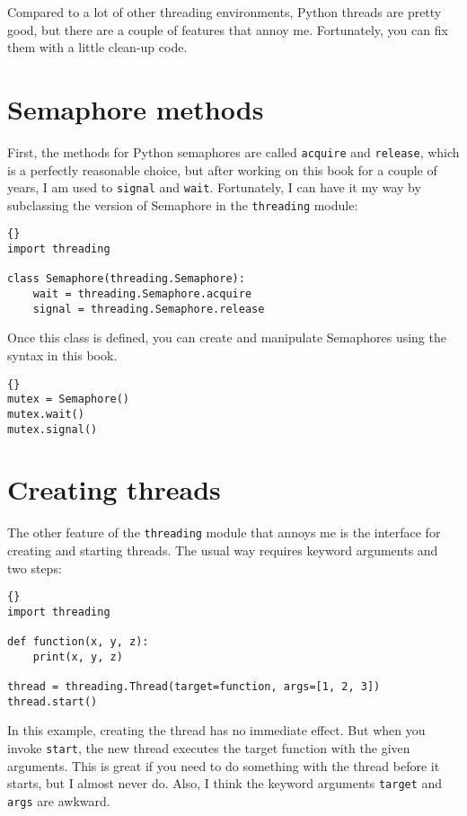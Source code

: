 \documentclass{book}
\begin{document}
Compared to a lot of other threading environments, Python threads are
pretty good, but there are a couple of features that annoy me.
Fortunately, you can fix them with a little clean-up code.

\section{Semaphore methods}

First, the methods for Python semaphores are called {\tt acquire}
and {\tt release}, which is a perfectly reasonable choice, but
after working on this book for a couple of years, I am used
to {\tt signal} and {\tt wait}.  Fortunately, I can have it
my way by subclassing the version of Semaphore in the
{\tt threading} module:

\begin{lstlisting}[title={Semaphore name change}]{}
import threading
 
class Semaphore(threading.Semaphore):
    wait = threading.Semaphore.acquire
    signal = threading.Semaphore.release
\end{lstlisting}

Once this class is defined, you can create and manipulate Semaphores
using the syntax in this book.

\begin{lstlisting}[title={Semaphore example}]{}
mutex = Semaphore()
mutex.wait()
mutex.signal()
\end{lstlisting}

\section{Creating threads}

The other feature of the {\tt threading} module that annoys
me is the interface for creating and starting threads.  The
usual way requires keyword arguments and two steps:

\begin{lstlisting}[title={Thread example (standard way)}]{}
import threading

def function(x, y, z):
    print(x, y, z)

thread = threading.Thread(target=function, args=[1, 2, 3])
thread.start()
\end{lstlisting}

In this example, creating the thread has no immediate effect.
But when you invoke {\tt start}, the new thread executes
the target function with the given arguments.
This is great if you need to do something with the thread
before it starts, but I almost never do.
Also, I think the keyword arguments {\tt target} and {\tt args}
are awkward.
\end{document}
